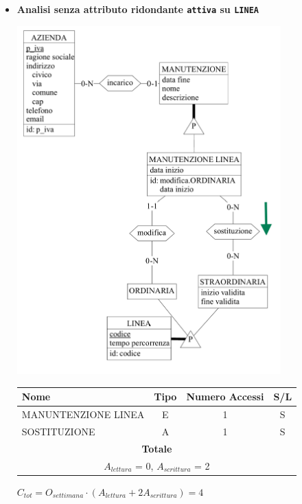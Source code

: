 \documentclass[12pt,a4paper]{report}
\begin{document}
\begin{enumerate}[label=\textbf{\arabic*)}]
\begin{itemize}
            \item \textbf{Analisi senza attributo ridondante \texttt{attiva} su \texttt{LINEA}} \\
	\begin{center}
	\includegraphics[width=0.8\textwidth]{InserimentoVariazioneServizioNoRid}
	\end{center}
	\begin{table}[H]
	\centering
	\begin{tabular}{|l|c|c|c|}
	\hline
	Nome & Tipo & Numero Accessi & S/L \\
	\hline
	MANUNTENZIONE LINEA & E & 1 & S \\
	\hline
	SOSTITUZIONE & A & 1 & S \\
	\hline
	    \multicolumn{4}{c}{\textbf{Totale}} \\
	    \multicolumn{4}{c}{${A_{lettura}}$ = 0, ${A_{scrittura}}$ = 2} \\
	    \hline
	    \end{tabular}
	    \end{table}
	    \begin{center}
	    ${C_{tot} = {O_{settimana}}\cdot({A_{lettura}} + {2A_{scrittura}})= 4}$
	    \end{center}

	\end{itemize}



\end{enumerate}
\end{document}
